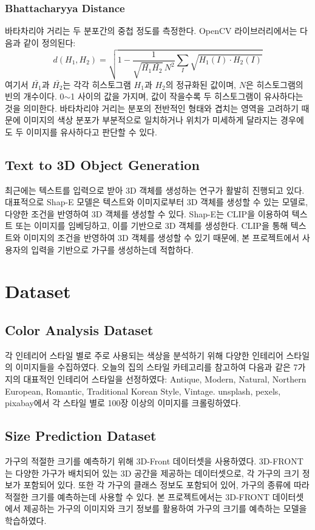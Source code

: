 \documentclass[11pt]{article}
\begin{document}
\subsubsection{Bhattacharyya Distance}
바타차리야 거리는 두 분포간의 중첩 정도를 측정한다. OpenCV 라이브러리\cite{opencv_library}에서는 다음과 같이 정의된다:
\begin{equation*}
    d(H_1, H_2) = \sqrt{1 - \frac{1}{\sqrt{\bar{H_1} \bar{H_2}} \, N^2} \sum_{I} \sqrt{H_1(I) \cdot H_2(I)}}
\end{equation*}
여기서 $\bar{H_1}$과 $\bar{H_2}$는 각각 히스토그램 $H_1$과 $H_2$의 정규화된 값이며, $N$은 히스토그램의 빈의 개수이다. 0$\sim$1 사이의 값을 가지며, 값이 작을수록 두 히스토그램이 유사하다는 것을 의미한다. 바타차리야 거리는 분포의 전반적인 형태와 겹치는 영역을 고려하기 때문에 이미지의 색상 분포가 부분적으로 일치하거나 위치가 미세하게 달라지는 경우에도 두 이미지를 유사하다고 판단할 수 있다.

\subsection{Text to 3D Object Generation}
최근에는 텍스트를 입력으로 받아 3D 객체를 생성하는 연구가 활발히 진행되고 있다. 대표적으로 Shap-E\cite{jun2023shapegeneratingconditional3d} 모델은 텍스트와 이미지로부터 3D 객체를 생성할 수 있는 모델로, 다양한 조건을 반영하여 3D 객체를 생성할 수 있다. Shap-E는 CLIP\cite{pmlr-v139-radford21a}을 이용하여 텍스트 또는 이미지를 임베딩하고, 이를 기반으로 3D 객체를 생성한다. CLIP을 통해 텍스트와 이미지의 조건을 반영하여 3D 객체를 생성할 수 있기 때문에, 본 프로젝트에서 사용자의 입력을 기반으로 가구를 생성하는데 적합하다.

\section{Dataset}
\subsection{Color Analysis Dataset}
각 인테리어 스타일 별로 주로 사용되는 색상을 분석하기 위해 다양한 인테리어 스타일의 이미지들을 수집하였다. 오늘의 집\cite{todayhouse}의 스타일 카테고리를 참고하여 다음과 같은 7가지의 대표적인 인테리어 스타일을 선정하였다: Antique, Modern, Natural, Northern European, Romantic, Traditional Korean Style, Vintage. unsplash\cite{unsplash}, pexels\cite{pexels}, pixabay\cite{pixabay}에서 각 스타일 별로 100장 이상의 이미지를 크롤링하였다.

\subsection{Size Prediction Dataset}
가구의 적절한 크기를 예측하기 위해 3D-Front\cite{fu20203dfront} 데이터셋을 사용하였다. 3D-FRONT는 다양한 가구가 배치되어 있는 3D 공간을 제공하는 데이터셋으로, 각 가구의 크기 정보가 포함되어 있다. 또한 각 가구의 클래스 정보도 포함되어 있어, 가구의 종류에 따라 적절한 크기를 예측하는데 사용할 수 있다. 본 프로젝트에서는 3D-FRONT 데이터셋에서 제공하는 가구의 이미지와 크기 정보를 활용하여 가구의 크기를 예측하는 모델을 학습하였다.
\end{document}
